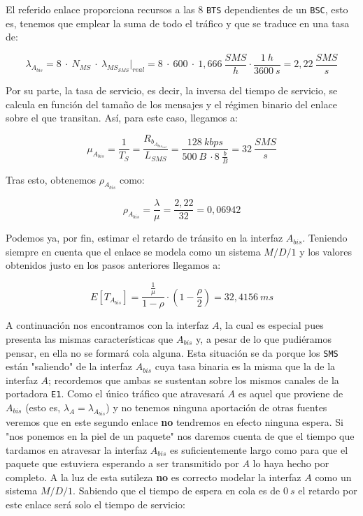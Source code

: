 \documentclass[10pt]{article}
\begin{document}
			El referido enlace proporciona recursos a las $8$ \texttt{BTS} dependientes de un \texttt{BSC}, esto es, tenemos que emplear la suma de todo el tráfico y que se traduce en una tasa de:

			$$\lambda_{A_{bis}} = 8\ \cdot\ N_{MS}\ \cdot\ \lambda_{MS_{SMS}}\biggr\rvert_{real} = 8\ \cdot\ 600\ \cdot\ 1,666\ \frac{SMS}{h} \cdot \frac{1\ h}{3600\ s} = 2,22\ \frac{SMS}{s}$$

			Por su parte, la tasa de servicio, es decir, la inversa del tiempo de servicio, se calcula en función del tamaño de los mensajes y el régimen binario del enlace sobre el que transitan. Así, para este caso, llegamos a:

			$$\mu_{A_{bis}} = \frac{1}{T_{S}} = \frac{R_{b_{A_{bis_{real}}}}}{L_{SMS}} = \frac{128\ kbps}{500\ B\ \cdot 8\ \frac{b}{B}} = 32\ \frac{SMS}{s}$$

			Tras esto, obtenemos $\rho_{A_{bis}}$ como:

			$$\rho_{A_{bis}} = \frac{\lambda}{\mu} = \frac{2,22}{32} = 0,06942$$

			Podemos ya, por fin, estimar el retardo de tránsito en la interfaz $A_{bis}$. Teniendo siempre en cuenta que el enlace se modela como un sistema $M/D/1$ y los valores obtenidos justo en los pasos anteriores llegamos a:

			$$E[T_{A_{bis}}] = \frac{\frac{1}{\mu}}{1 - \rho} \cdot (1 - \frac{\rho}{2}) = 32,4156\ ms$$
			
			A continuación nos encontramos con la interfaz $A$, la cual es especial pues presenta las mismas características que $A_{bis}$ y, a pesar de lo que pudiéramos pensar, en ella no se formará cola alguna. Esta situación se da porque los \texttt{SMS} están "saliendo" de la interfaz $A_{bis}$ cuya tasa binaria es la misma que la de la interfaz $A$; recordemos que ambas se sustentan sobre los mismos canales de la portadora \texttt{E1}. Como el único tráfico que atravesará $A$ es aquel que proviene de $A_{bis}$ (esto es, $\lambda_A = \lambda_{A_{bis}}$) y no tenemos ninguna aportación de otras fuentes veremos que en este segundo enlace \textbf{no} tendremos en efecto ninguna espera. Si "nos ponemos en la piel de un paquete" nos daremos cuenta de que el tiempo que tardamos en atravesar la interfaz $A_{bis}$ es suficientemente largo como para que el paquete que estuviera esperando a ser transmitido por $A$ lo haya hecho por completo. A la luz de esta sutileza \textbf{no} es correcto modelar la interfaz $A$ como un sistema $M/D/1$. Sabiendo que el tiempo de espera en cola es de $0\ s$ el retardo por este enlace será solo el tiempo de servicio:
			
\end{document}
